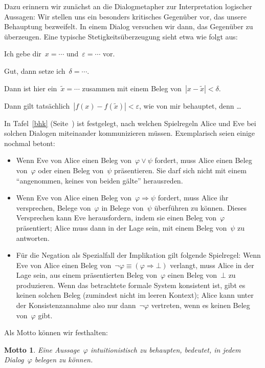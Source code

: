 \documentclass[a4paper,ngerman,12pt]{scrartcl}
\theoremstyle{definition}
\theoremstyle{plain}
\newtheorem{motto}[defn]{Motto}
\theoremstyle{remark}
\renewcommand{\_}{\mathpunct{.}\,}
\newcommand{\?}{\,{:}\,}
\newcommand{\Alice}{\item[Alice]}
\newcommand{\Eve}{\item[Eve]}
\newenvironment{dialogue}[1]{%
  \begin{list}{}{%
    \settowidth{\labelwidth}{\qquad\emph{#1:}}
    \setlength{\labelsep}{0.3cm}
    \setlength{\leftmargin}{\labelwidth}
    \addtolength{\leftmargin}{\labelsep}
    \setlength{\rightmargin}{0pt}
    \setlength{\parsep}{0.5ex plus 0.2ex minus 0.1ex}
    \setlength{\itemsep}{0 ex plus 0.2ex}
    \renewcommand{\makelabel}[1]{\qquad\emph{##1:}\hfil}
    }
}{\end{list}}
\begin{document}
Dazu erinnern wir zunächst an die Dialogmetapher zur Interpretation logischer
Aussagen:
Wir stellen uns ein besonders kritisches Gegenüber vor, das unsere Behauptung
bezweifelt. In einem Dialog versuchen wir dann, das Gegenüber zu überzeugen.
Eine typische Stetigkeitsüberzeugung sieht etwa wie folgt aus:

\begin{dialogue}{Alice}
\Eve Ich gebe dir~$x = \cdots$ und~$\varepsilon = \cdots$ vor.
\Alice Gut, dann setze ich~$\delta = \cdots$.
\Eve Dann ist hier ein~$\tilde x = \cdots$ zusammen mit einem Beleg von~$|x -
\tilde x| < \delta$.
\Alice Dann gilt tatsächlich~$|f(x) - f(\tilde x)| < \varepsilon$,
wie von mir behauptet, denn \ldots
\end{dialogue}

In Tafel~\ref{bhk} (Seite~\pageref{bhk}) ist festgelegt, nach welchen
Spielregeln Alice und Eve bei solchen Dialogen miteinander kommunizieren
müssen. Exemplarisch seien einige nochmal betont:
\begin{itemize}
\item Wenn Eve von Alice einen Beleg von~$\varphi \vee \psi$ fordert,
muss Alice einen Beleg von~$\varphi$ oder einen Beleg von~$\psi$ präsentieren.
Sie darf sich nicht mit einem "`angenommen, keines von beiden gälte"'
herausreden.
\item Wenn Eve von Alice einen Beleg von~$\varphi \Rightarrow \psi$
fordert, muss Alice ihr versprechen, Belege von~$\varphi$ in Belege von~$\psi$
überführen zu können. Dieses Versprechen kann Eve herausfordern, indem sie
einen Beleg von~$\varphi$ präsentiert; Alice muss dann in der Lage sein, mit
einem Beleg von~$\psi$ zu antworten.
\item Für die Negation als Spezialfall der Implikation gilt folgende Spielregel: Wenn Eve von
Alice einen Beleg von~$\neg\varphi \equiv (\varphi \Rightarrow \bot)$ verlangt,
muss Alice in der Lage sein, aus einem präsentierten Beleg von~$\varphi$ einen
Beleg von~$\bot$ zu produzieren. Wenn das betrachtete formale System konsistent
ist, gibt es keinen solchen Beleg (zumindest nicht im leeren Kontext); Alice kann unter der Konsistenzannahme also
nur dann~$\neg\varphi$ vertreten, wenn es keinen Beleg von~$\varphi$ gibt.
\end{itemize}

Als Motto können wir festhalten:

\begin{motto}
Eine Aussage~$\varphi$ intuitionistisch zu behaupten, bedeutet, in jedem
Dialog~$\varphi$ belegen zu können.
\end{motto}
\end{document}
